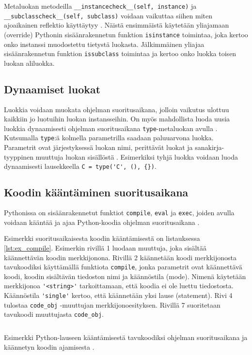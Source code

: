 \documentclass[finnish]{tktltiki2}
\theoremstyle{definition}
\theoremstyle{remark}
\begin{document}
Metaluokan metodeilla \verb|__instancecheck__(self, instance)| ja \\\lstinline|__subclasscheck__(self, subclass)| voidaan vaikuttaa siihen miten ajoaikainen reflektio käyttäytyy \cite{magic-methods, Python-docs}. Näistä ensimmäistä käytetään yliajamaan (override) Pythonin sisäänrakennetun funktion \verb|isinstance| toimintaa, joka kertoo onko instanssi muodostettu tietystä luokasta. Jälkimmäinen yliajaa sisäänrakennetun funktion \verb|issubclass| toimintaa ja kertoo onko luokka toisen luokan aliluokka. 

\subsection{Dynaamiset luokat}

Luokkia voidaan muokata ohjelman suoritusaikana, jolloin vaikutus ulottuu kaikkiin jo luotuihin luokan instansseihin. On myös mahdollista luoda uusia luokkia dynaamisesti ohjelman suoritusaikana \verb|type|-metaluokan avulla \cite{MetaprogP3}. Kutsumalla \verb|type|:ä kolmella parametrilla saadaan paluuarvona luokka. Parametrit ovat järjestyksessä luokan nimi, perittävät luokat ja sanakirja-tyyppinen muuttuja luokan sisällöstä \cite{MetaprogP3}. Esimerkiksi tyhjä luokka voidaan luoda dynaamisesti lausekkeella \verb|C = type('C', (), {})|.


\subsection{Koodin kääntäminen suoritusaikana}

Pythonissa on sisäänrakennetut funktiot \verb|compile|, \verb|eval| ja \verb|exec|, joiden avulla voidaan kääntää ja ajaa Python-koodia ohjelman suoritusaikana \cite{codeobjects}.

Esimerkki suoritusaikaisesta koodin kääntämisestä on listauksessa \ref{lst:ex_compile}. Esimerkin rivillä 1 luodaan muuttuja, joka sisältää käännettävän koodin merkkijonona. Rivillä 2 käännetään koodi merkkijonosta tavukoodiksi käyttämällä funktiota \verb|compile|, jonka parametrit ovat käännettävä koodi, koodin sisältävän tiedoston nimi ja käännöstila (mode). Nimenä käytetään merkkijonoa \verb|'<string>'| tarkoittamaan, että koodia ei ole luettu tiedostosta. Käännöstila \verb|'single'| kertoo, että käännetään yksi lause (statement). Rivi 4 tulostaa \verb|code_obj| -muuttujan merkkijonoesityksen. Rivillä 7 suoritetaan tavukoodi muuttujasta \verb|code_obj|.

\begin{listing}
    \inputminted[linenos,frame=single,framesep=10pt]{python}{code/dynamichello.py}
    \caption{Esimerkki Python-lauseen kääntämisestä tavukoodiksi ohjelman suoritusaikana ja käännetyn koodin ajamisesta \cite{codeobjects}.}
    \label{lst:ex_compile}
\end{listing}
\end{document}
